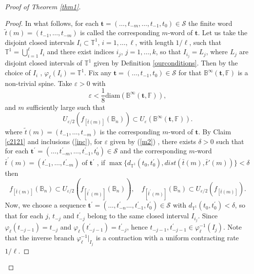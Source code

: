 \documentclass[11pt,reqno]{amsart}
\theoremstyle{plain}
\newtheorem*{theorem A}{Theorem A}
\newtheorem*{theorem B}{Theorem B}
\newtheorem*{theorem C}{Theorem C}
\newtheorem*{theorem 1}{Theorem 1}
\newtheorem*{theorem 2}{Theorem 2}
\newtheorem*{theorem 3}{Theorem 3}
\numberwithin{equation}{section}
\begin{document}
\begin{proof}[Proof of Theorem \ref{thm1}]
\begin{proof}
In what follows, for each $\textbf{t} = (\ldots , t_{-m},\ldots , t_{-1}, t_{0}) \in \mathcal{S} $ the finite word $\tilde{t}(m) = (t_{-1},\ldots , t_{-m})$ is called the corresponding $m$-word of $\textbf{t}$.
Let us take the disjoint closed intervals $I_i \subset \mathbb{T}^1$, $i=1, \dots, \ell$, with length $1/ \ell$, such that $\mathbb{T}^1=\bigcup_{i=1}^\ell I_i$ and there exist indices $i_j$, $j=1, \dots, k$, so that $I_{i_j}=L_j$, where $L_j$ are disjoint closed intervals of $\mathbb{T}^1$ given by Definition \ref{ourconditions}.
Then by the choice of $I_{i}$ , $\varphi_\ell (I_i)=\mathbb{T}^1$.
Fix any $\textbf{t}=(\dots, t_{-1}, t_0) \in \mathcal{S}$ for that $\mathbb{B}^{\infty}(\textbf{t},\mathbb{F})$ is a non-trivial spine.
Take $\varepsilon > 0$ with
\begin{equation}\label{m2}
\varepsilon <\frac{1}{8} \text{diam}(\mathbb{B}^{\infty}(\textbf{t},\mathbb{F})),
\end{equation}
and $m$ sufficiently large such that
\begin{equation}\label{m3}
U_{\varepsilon/2}( f_{[\bar t(m)]}(\mathbb{B}_n))\subset U_{\varepsilon}(\mathbb{B}^{\infty}(\textbf{t},\mathbb{F})).
\end{equation}
where $\tilde{t}(m) = (t_{-1}, \ldots , t_{-m})$ is the corresponding $m$-word of $\textbf{t}$.
By Claim \ref{c2121} and inclusions (\ref{inc}), for $\varepsilon$ given by (\ref{m2}) , there exists $\delta > 0$ such that for each $\textbf{t}^{\prime}=(\ldots, t^{\prime}_{-m}, \ldots, t^{\prime}_{-1}, t^{\prime}_0) \in \mathcal{S}$ and the corresponding $m$-word $\bar t^{\prime}(m)=(t^{\prime}_{-1}, \dots, t^{\prime}_{-m})$ of $\textbf{t}^{\prime}$ , if $ \max\{d_{\mathbb{T}^1}(t_0, t^{\prime}_0), {dist} (\bar t(m) , \bar t'(m))\} < \delta$ then
\begin{equation}\label{m1}
 f_{[\bar t(m)]}(\mathbb{B}_n)\subset U_{\varepsilon/2}(f_{[\bar t^{\prime}(m)]}(\mathbb{B}_n)), \quad f_{[\bar t^{\prime}(m)]}(\mathbb{B}_n)\subset U_{\varepsilon/2}(f_{[\bar t(m)]}).
\end{equation}
Now, we choose a sequence $\textbf{t}^{\prime}=(\ldots, t^{\prime}_{-n}\ldots, t^{\prime}_{-1}, t^{\prime}_0)\in \mathcal{S}$ with $d_{\mathbb{T}^1}(t_{0} , t^{\prime}_{0})<\delta$, so that for each $j$, $t_{-j}$ and $t^{\prime}_{-j}$ belong to the same closed interval $I_{i_j}$.
Since $\varphi_\ell(t_{-j-1})=t_{-j}$ and $\varphi_\ell(t^{\prime}_{-j-1})=t^{\prime}_{-j}$, hence $t_{-j-1}, t^{\prime}_{-j-1} \in \varphi^{-1}_\ell(I_j)$.
Note that the inverse branch $\varphi^{-1}_\ell|_{I_j}$ is a contraction with a uniform contracting rate $1/\ell$.

\end{proof}
\end{proof}
\end{document}
